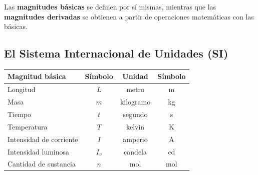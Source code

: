 Las \textbf{magnitudes básicas} se definen por sí mismas, mientras que las \textbf{magnitudes derivadas} se obtienen a partir de operaciones matemáticas con las básicas.

\subsection{El Sistema Internacional de Unidades (SI)}

\begin{center}
    {\small
    \begin{tabular}{@{}lccc@{}}
        \toprule
        \textbf{Magnitud básica} & \textbf{Símbolo} & \textbf{Unidad} & \textbf{Símbolo} \\
        \midrule
        Longitud & \(L\) & metro & \unit{\m} \\[3pt]
        Masa & \(m\) & kilogramo & \unit{\kg} \\[3pt]
        Tiempo & \(t\) & segundo & \unit{\s} \\[3pt]
        Temperatura & \(T\) & kelvin & \unit{\kelvin} \\[3pt]
        Intensidad de corriente & \(I\) & amperio & \unit{\ampere} \\[3pt]
        Intensidad luminosa & \(I_v\) & candela & \unit{\candela} \\[3pt]
        Cantidad de sustancia & \(n\) & mol & \unit{\mol} \\
        \bottomrule
    \end{tabular}
}
\end{center}
